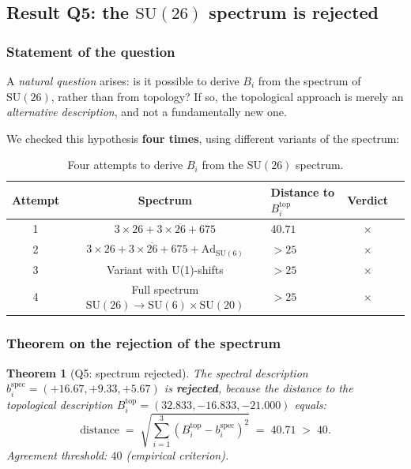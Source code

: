 \documentclass[11pt,a4paper]{article}
\newcommand{\SU}{\ensuremath{\mathrm{SU}}}
\newcommand{\Ad}{\ensuremath{\mathrm{Ad}}}
\newtheorem{theorem}{Theorem}[section]
\theoremstyle{definition}
\begin{document}
\subsection{Result Q5: the \texorpdfstring{$\SU(26)$}{(26)} spectrum is rejected}
\label{subsec:bi-q5}

\subsubsection{Statement of the question}

A \emph{natural question} arises: is it possible to derive $B_i$
from the spectrum of $\SU(26)$, rather than from topology? If so, the
topological approach is merely an \emph{alternative description},
and not a fundamentally new one.

\medskip\noindent
We checked this hypothesis \textbf{four times}, using
different variants of the spectrum:

\begin{table}[ht]
\centering
\caption{Four attempts to derive \texorpdfstring{$B_i$}{B\_i} from the \texorpdfstring{$\SU(26)$}{(26)} spectrum.}
\label{tab:spectrum-attempts-q5}
\begin{tabular}{cclcc}
\toprule
Attempt & Spectrum & Distance to $B_i^{\text{top}}$ & Verdict \\
\midrule
1 & $3 \times 26 + 3 \times \overline{26} + 675$ & $40.71$ & $\times$ \\
2 & $3 \times 26 + 3 \times \overline{26} + 675 + \Ad_{\SU(6)}$ & $> 25$ & $\times$ \\
3 & Variant with U(1)-shifts & $> 25$ & $\times$ \\
4 & Full spectrum $\SU(26) \to \SU(6) \times \SU(20)$ & $> 25$ & $\times$ \\
\bottomrule
\end{tabular}
\end{table}

\subsubsection{Theorem on the rejection of the spectrum}

\begin{theorem}[Q5: spectrum rejected]
\label{thm:q5-rejected}
The spectral description $b_i^{\text{spec}} = (+16.67, +9.33, +5.67)$
is \textbf{rejected}, because the distance to the topological
description $B_i^{\text{top}} = (32.833, -16.833, -21.000)$ equals:
\begin{equation}
    \boxed{
    \text{distance} \;=\; \sqrt{\sum_{i=1}^{3}
    (B_i^{\text{top}} - b_i^{\text{spec}})^2} \;=\; 40.71 \;>\; 40.
    }
    \label{eq:distance-q5}
\end{equation}
Agreement threshold: $40$ (empirical criterion).
\end{theorem}
\end{document}
